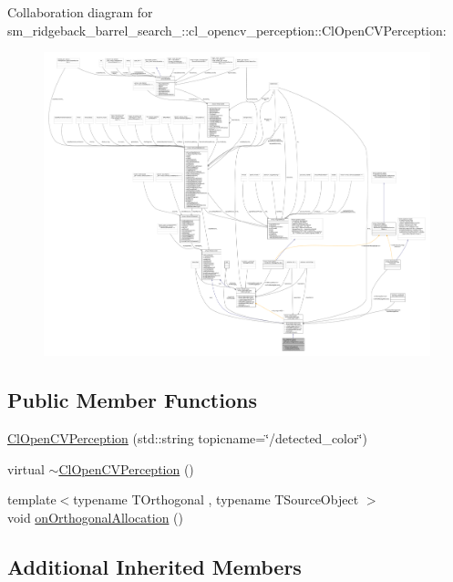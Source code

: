 Collaboration diagram for sm\+\_\+ridgeback\+\_\+barrel\+\_\+search\+\_\+:\+:cl\+\_\+opencv\+\_\+perception\+:\+:Cl\+Open\+C\+V\+Perception\+:
\nopagebreak
\begin{figure}[H]
\begin{center}
\leavevmode
\includegraphics[width=350pt]{classsm__ridgeback__barrel__search__1_1_1cl__opencv__perception_1_1ClOpenCVPerception__coll__graph}
\end{center}
\end{figure}
\subsection*{Public Member Functions}
\begin{DoxyCompactItemize}
\item 
\hyperlink{classsm__ridgeback__barrel__search__1_1_1cl__opencv__perception_1_1ClOpenCVPerception_a411b75a84686141faea2f3ee9e035408}{Cl\+Open\+C\+V\+Perception} (std\+::string topicname=\char`\"{}/detected\+\_\+color\char`\"{})
\item 
virtual \hyperlink{classsm__ridgeback__barrel__search__1_1_1cl__opencv__perception_1_1ClOpenCVPerception_a9bb0bdf341e26653fd3717f8fbb03eac}{$\sim$\+Cl\+Open\+C\+V\+Perception} ()
\item 
{\footnotesize template$<$typename T\+Orthogonal , typename T\+Source\+Object $>$ }\\void \hyperlink{classsm__ridgeback__barrel__search__1_1_1cl__opencv__perception_1_1ClOpenCVPerception_afad18dc9b724fbf593c4b36823c19b2d}{on\+Orthogonal\+Allocation} ()
\end{DoxyCompactItemize}
\subsection*{Additional Inherited Members}


